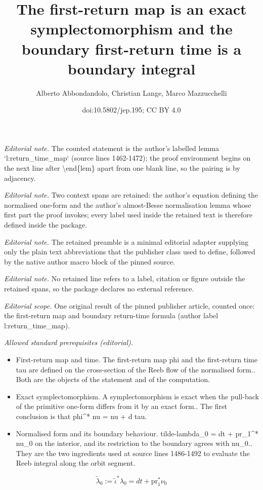 \documentclass[10pt,a4paper]{article}
\title{The first-return map is an exact symplectomorphism and the boundary first-return time is a boundary integral}
\author{Alberto Abbondandolo, Christian Lange, Marco Mazzucchelli}
\date{doi:10.5802/jep.195; CC BY 4.0}
\theoremstyle{definition}
\newcommand{\pr}{\mathrm{pr}}
\let\diff d
\begin{document}
\maketitle
\noindent\textit{Editorial note.} The counted statement is the author's labelled lemma `l:return\_time\_map` (source lines 1462-1472); the proof environment begins on the next line after \textbackslash{}end\{lem\} apart from one blank line, so the pairing is by adjacency.\par\medskip
\noindent\textit{Editorial note.} Two context spans are retained: the author's equation defining the normalised one-form and the author's almost-Besse normalisation lemma whose first part the proof invokes; every label used inside the retained text is therefore defined inside the package.\par\medskip
\noindent\textit{Editorial note.} The retained preamble is a minimal editorial adapter supplying only the plain text abbreviations that the publisher class used to define, followed by the native author macro block of the pinned source.\par\medskip
\noindent\textit{Editorial note.} No retained line refers to a label, citation or figure outside the retained spans, so the package declares no external reference.\par\medskip
\noindent\textit{Editorial scope.} One original result of the pinned publisher article, counted once: the first-return map and boundary return-time formula (author label l:return\_time\_map).\par\medskip
\noindent\textit{Allowed standard prerequisites (editorial).}\begin{itemize}
\item First-return map and time. The first-return map phi and the first-return time tau are defined on the cross-section of the Reeb flow of the normalised form.. Both are the objects of the statement and of the computation.
\item Exact symplectomorphism. A symplectomorphism is exact when the pull-back of the primitive one-form differs from it by an exact form.. The first conclusion is that phi\textasciicircum{}* nu = nu + d tau.
\item Normalised form and its boundary behaviour. tilde-lambda\_0 = dt + pr\_1\textasciicircum{}* nu\_0 on the interior, and its restriction to the boundary agrees with nu\_0.. They are the two ingredients used at source lines 1486-1492 to evaluate the Reeb integral along the orbit segment.
\end{itemize}\medskip
\begin{equation}
\label{e:tilde_lambda_0}
\tilde\lambda_0
:=
\tilde\iota^*\lambda_0=\diff t+\pr_1^*\nu_0
\end{equation}
\end{document}
